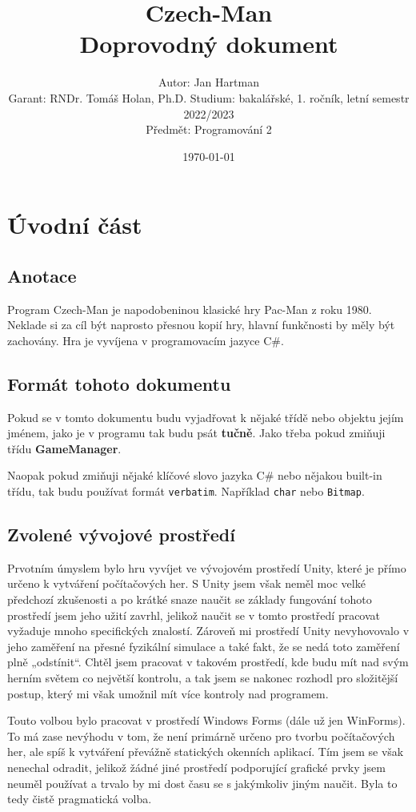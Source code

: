 \documentclass[a4]{article}
\title{Czech-Man
\\Doprovodný dokument}
\author{Autor: Jan Hartman
\\Garant: RNDr. Tomáš Holan, Ph.D.
Studium: bakalářské, 1. ročník, letní semestr 2022/2023
\\Předmět: Programování 2}
\date{\today}
\begin{document}
\maketitle
\tableofcontents
\pagestyle{fancy}
\newpage
\section{Úvodní část}
\subsection{Anotace}
Program Czech-Man je napodobeninou klasické hry Pac-Man z roku 1980. Neklade si za cíl být naprosto přesnou kopií hry, hlavní funkčnosti by měly být zachovány. Hra je vyvíjena v programovacím jazyce C\#.
\subsection{Formát tohoto dokumentu}
Pokud se v tomto dokumentu budu vyjadřovat k nějaké třídě nebo objektu jejím jménem, jako je v programu tak budu psát \textbf{tučně}. Jako třeba pokud zmiňuji třídu \textbf{GameManager}.

Naopak pokud zmiňuji nějaké klíčové slovo jazyka C\# nebo nějakou built-in třídu, tak budu používat formát \verb|verbatim|. Například \verb|char| nebo \verb|Bitmap|.
\subsection{Zvolené vývojové prostředí}
Prvotním úmyslem bylo hru vyvíjet ve vývojovém prostředí Unity, které je přímo určeno k vytváření počítačových her. S Unity jsem však neměl moc velké předchozí zkušenosti a po krátké snaze naučit se základy fungování tohoto prostředí jsem jeho užití zavrhl, jelikož naučit se v tomto prostředí pracovat vyžaduje mnoho specifických znalostí. Zároveň mi prostředí Unity nevyhovovalo v jeho zaměření na přesné fyzikální simulace a také fakt, že se nedá toto zaměření plně „odstínit“. Chtěl jsem pracovat v takovém prostředí, kde budu mít nad svým herním světem co největší kontrolu, a tak jsem se nakonec rozhodl pro složitější postup, který mi však umožnil mít více kontroly nad programem.

Touto volbou bylo pracovat v prostředí Windows Forms (dále už jen WinForms). To má zase nevýhodu v tom, že není primárně určeno pro tvorbu počítačových her, ale spíš k vytváření převážně statických okenních aplikací. Tím jsem se však nenechal odradit, jelikož žádné jiné prostředí podporující grafické prvky jsem neuměl používat a trvalo by mi dost času se s jakýmkoliv jiným naučit. Byla to tedy čistě pragmatická volba.
\newpage
\end{document}
